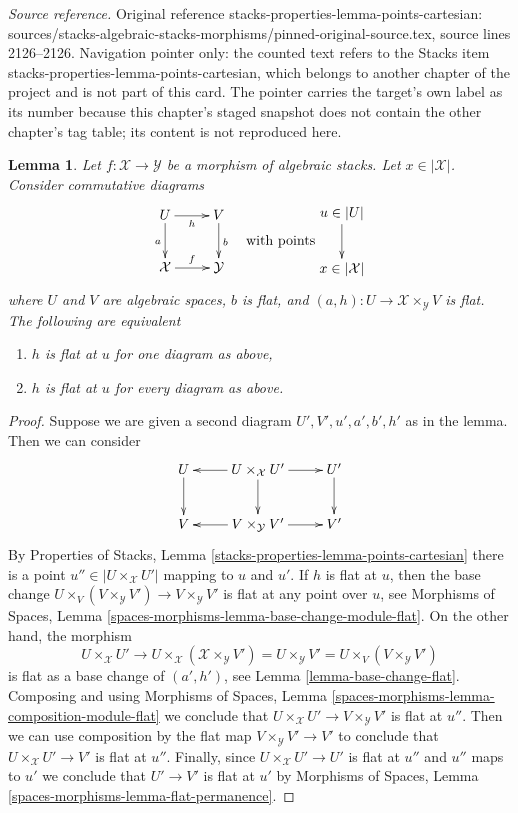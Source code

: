 \documentclass[10pt,a4paper]{amsart}
\theoremstyle{plain}
\newtheorem{lemma}[subsection]{Lemma}
\theoremstyle{definition}
\theoremstyle{remark}
\numberwithin{equation}{subsection}
\begin{document}
\noindent\textit{Source reference.} Original reference stacks-properties-lemma-points-cartesian: sources/stacks-algebraic-stacks-morphisms/pinned-original-source.tex, source lines 2126--2126. Navigation pointer only: the counted text refers to the Stacks item stacks-properties-lemma-points-cartesian, which belongs to another chapter of the project and is not part of this card. The pointer carries the target's own label as its number because this chapter's staged snapshot does not contain the other chapter's tag table; its content is not reproduced here.\par\medskip
\begin{lemma}
\label{lemma-flat-at-point}
Let $f : \mathcal{X} \to \mathcal{Y}$ be a morphism of algebraic stacks.
Let $x \in |\mathcal{X}|$. Consider commutative diagrams
$$
\vcenter{
\xymatrix{
U \ar[d]_a \ar[r]_h & V \ar[d]^b \\
\mathcal{X} \ar[r]^f & \mathcal{Y}
}
}
\quad\text{with points}
\vcenter{
\xymatrix{
u \in |U| \ar[d] \\
x \in |\mathcal{X}|
}
}
$$
where $U$ and $V$ are algebraic spaces, $b$ is flat, and
$(a, h) : U \to \mathcal{X} \times_\mathcal{Y} V$
is flat. The following are equivalent
\begin{enumerate}
\item $h$ is flat at $u$ for one diagram as above,
\item $h$ is flat at $u$ for every diagram as above.
\end{enumerate}
\end{lemma}

\begin{proof}
Suppose we are given a second diagram $U', V', u', a', b', h'$ as
in the lemma. Then we can consider
$$
\xymatrix{
U \ar[d] & U \times_\mathcal{X} U' \ar[l] \ar[d] \ar[r] & U' \ar[d] \\
V & V \times_\mathcal{Y} V' \ar[l] \ar[r] & V'
}
$$
By Properties of Stacks, Lemma \ref{stacks-properties-lemma-points-cartesian}
there is a point $u'' \in |U \times_\mathcal{X} U'|$ mapping
to $u$ and $u'$. If $h$ is flat at $u$, then the base change
$U \times_V (V \times_\mathcal{Y} V') \to V \times_\mathcal{Y} V'$
is flat at any point over $u$, see
Morphisms of Spaces, Lemma \ref{spaces-morphisms-lemma-base-change-module-flat}.
On the other hand, the morphism
$$
U \times_\mathcal{X} U' \to
U \times_\mathcal{X} (\mathcal{X} \times_\mathcal{Y} V') =
U \times_\mathcal{Y} V' =
U \times_V (V \times_\mathcal{Y} V')
$$
is flat as a base change of $(a', h')$, see Lemma \ref{lemma-base-change-flat}.
Composing and using
Morphisms of Spaces, Lemma \ref{spaces-morphisms-lemma-composition-module-flat}
we conclude that $U \times_\mathcal{X} U' \to V \times_\mathcal{Y} V'$
is flat at $u''$. Then we can use composition by the flat map
$V \times_\mathcal{Y} V' \to V'$ to conclude that
$U \times_\mathcal{X} U' \to V'$ is flat at $u''$.
Finally, since $U \times_\mathcal{X} U' \to U'$ is flat
at $u''$ and $u''$ maps to $u'$ we conclude that
$U' \to V'$ is flat at $u'$ by
Morphisms of Spaces, Lemma \ref{spaces-morphisms-lemma-flat-permanence}.
\end{proof}
\end{document}
